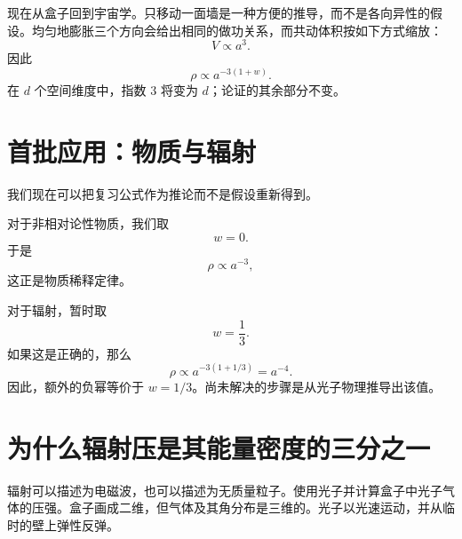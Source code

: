 现在从盒子回到宇宙学。只移动一面墙是一种方便的推导，而不是各向异性的假设。均匀地膨胀三个方向会给出相同的做功关系，而共动体积按如下方式缩放：
\begin{equation}
V\propto a^3.
\end{equation}
因此
\begin{equation}
\boxed{\rho\propto a^{-3(1+w)}}.
\label{eq:c05-density-scaling}
\end{equation}
在 \(d\) 个空间维度中，指数 \(3\) 将变为 \(d\)；论证的其余部分不变。

\section{首批应用：物质与辐射}

我们现在可以把复习公式作为推论而不是假设重新得到。

对于非相对论性物质，我们取
\begin{equation}
w=0.
\end{equation}
于是
\begin{equation}
\rho\propto a^{-3},
\end{equation}
这正是物质稀释定律。

对于辐射，暂时取
\begin{equation}
w=\frac13.
\end{equation}
如果这是正确的，那么
\begin{equation}
\rho\propto a^{-3(1+1/3)}=a^{-4}.
\end{equation}
因此，额外的负幂等价于 \(w=1/3\)。尚未解决的步骤是从光子物理推导出该值。

\section{为什么辐射压是其能量密度的三分之一}

辐射可以描述为电磁波，也可以描述为无质量粒子。使用光子并计算盒子中光子气体的压强。盒子画成二维，但气体及其角分布是三维的。光子以光速运动，并从临时的壁上弹性反弹。


